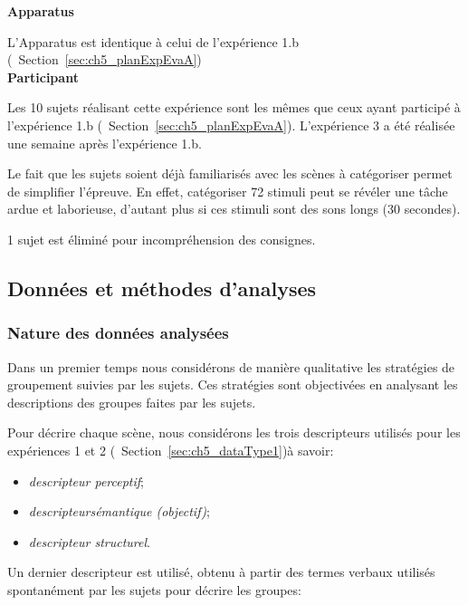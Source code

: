 \textbf{Apparatus}

L'Apparatus est identique à celui de l'expérience 1.b (\cf~Section~\ref{sec:ch5_planExpEvaA}) \\

\textbf{Participant}

Les 10 sujets réalisant cette expérience sont les mêmes que ceux ayant participé à l'expérience 1.b (\cf~Section~\ref{sec:ch5_planExpEvaA}). L'expérience 3 a été réalisée une semaine après l'expérience 1.b. 

Le fait que les sujets soient déjà familiarisés avec les scènes à catégoriser permet de simplifier l'épreuve. En effet, catégoriser 72 stimuli peut se révéler une tâche ardue et laborieuse, d'autant plus si ces stimuli sont des sons longs (30 secondes).

1 sujet est éliminé pour incompréhension des consignes.

\subsection{Données et méthodes d'analyses}

\subsubsection{Nature des données analysées}
\label{sec:ch5_dataXp3}

Dans un premier temps nous considérons de manière qualitative les stratégies de groupement suivies par les sujets. Ces stratégies sont objectivées en analysant les descriptions des groupes faites par les sujets.

Pour décrire chaque scène, nous considérons les trois descripteurs utilisés pour les expériences 1 et 2 (\cf~Section~\ref{sec:ch5_dataType1})à savoir:

\begin{itemize}
\item \emph{descripteur perceptif};
\item \emph{descripteursémantique (objectif)};
\item \emph{descripteur structurel}.
\end{itemize}

Un dernier descripteur est utilisé, obtenu à partir des termes verbaux utilisés spontanément par les sujets pour décrire les groupes:

